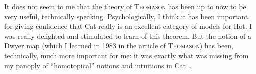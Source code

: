 \documentclass[11pt]{article}
\begin{document}
It does not seem to me that the theory of \textsc{Thomason} has been up to now to be very useful, technically speaking. Psychologically, I think it has been important, for giving confidence that Cat really is an excellent category of models for Hot. I was really delighted and stimulated to learn of this theorem. But the notion of a Dwyer map (which I learned in 1983 in the article of \textsc{Thomason}) has been, technically, much more important for me: it was exactly what was missing from my panoply of ``homotopical'' notions and intuitions in Cat \dots
\end{document}
